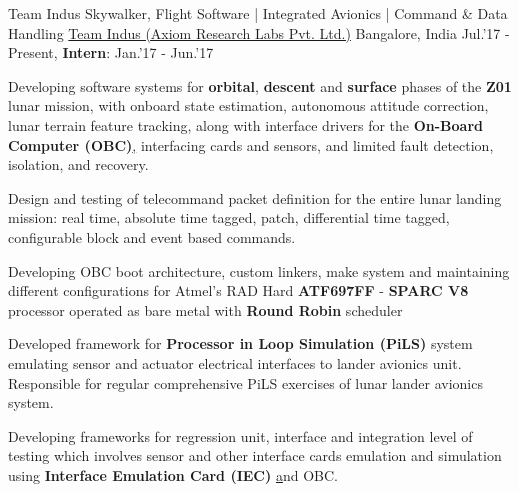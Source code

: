 \begin{cventries}
	\cventry
	{Team Indus Skywalker, Flight Software | Integrated Avionics | Command \& Data Handling}
	{\href{http://www.teamindus.in/}{Team Indus (Axiom Research Labs Pvt. Ltd.)}}
	{Bangalore, India}
	{Jul.'17 - Present, \textbf{Intern}: Jan.'17 - Jun.'17}
	{
		\begin{cvitems}
		\item{Developing software systems for \textbf{orbital}, \textbf{descent} and \textbf{surface} phases of the \textbf{Z01} lunar mission, with onboard state estimation, autonomous attitude correction, lunar terrain feature tracking, along with interface drivers for the \textbf{On-Board Computer (OBC)}\href{http://ww1.microchip.com/downloads/en/DeviceDoc/ATF697FF.pdf}, interfacing cards and sensors, and limited fault detection, isolation, and recovery.}
			\item{Design and testing of telecommand packet definition for the entire lunar landing mission: real time, absolute time tagged, patch, differential time tagged, configurable block and event based commands.}
			\item{Developing OBC boot architecture, custom linkers, make system and maintaining different configurations for Atmel's RAD Hard \textbf{ATF697FF} - \textbf{SPARC V8} processor operated as bare metal with \textbf{Round Robin} scheduler}
			\item{Developed framework for \textbf{Processor in Loop Simulation (PiLS)} system emulating sensor and actuator electrical interfaces to lander avionics unit. Responsible for regular comprehensive PiLS exercises of lunar lander avionics system.}
			\item{Developing frameworks for regression unit, interface and integration level of testing which involves sensor and other interface cards emulation and simulation using \textbf{Interface Emulation Card (IEC) }\href{http://zedboard.org/product/microzed/} and OBC.}
		\end{cvitems}
	}
\end{cventries}
